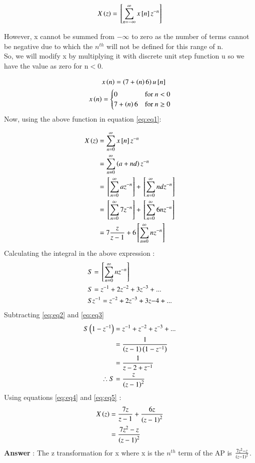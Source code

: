 \documentclass[journal,12pt,twocolumn]{IEEEtran}
\theoremstyle{remark}
\begin{document}
\begin{equation}\label{eq:eq1}
    X\left(z\right) ={}\left[\sum_{n=-\infty}^{\infty}x{}\left[n\right]z^{-n}\right] 
\end{equation}

However, x cannot be summed from $-\infty$ to zero as the number of terms cannot be negative due to which the $n^{th}$ will not be defined for this range of n.\\
So, we will modify x by multiplying it with discrete unit step function u so we have the value as zero for n$<$0.

\begin{align}
&x\left(n\right) = \left(7 + \left(n\right)6\right)u{}\left[n\right] \\
     x\left(n\right) & = \begin{cases} 
        0 & \text{for } n < 0 \\
        7 + \left(n\right)6 & \text{for } n \geq 0
    \end{cases}
\end{align}
Now, using the above function in equation \eqref{eq:eq1}: 

\begin{align}
X\left(z\right) &= \sum_{n=0}^{\infty}x{}\left[n\right]z^{-n}\\
 &= \sum_{n=0}^{\infty}\left(a+nd\right)z^{-n} \\
 &=  {}\left[\sum_{n=0}^{\infty}az^{-n}\right] + {}\left[\sum_{n=0}^{\infty}ndz^{-n}\right]\\
 &=  {}\left[\sum_{n=0}^{\infty}7z^{-n}\right] + {}\left[\sum_{n=0}^{\infty}6nz^{-n}\right]\\
 &= 7\frac{z}{z-1} + 6{}\left[\sum_{n=0}^{\infty}nz^{-n}\right] \label{eq:eq4}
\end{align}
Calculating the integral in the above expression :\\
\begin{align}
&S =  {}\left[\sum_{n=0}^{\infty}nz^{-n}\right]\\ 
&S = z^{-1} + 2z^{-2} + 3z^{-3} + ... \label{eq:eq2}\\
&Sz^{-1} = z^{-2} + 2z^{-3} + 3z{-4} + \label{eq:eq3} ... 
\end{align}
Subtracting \eqref{eq:eq2} and \eqref{eq:eq3} \\
\begin{align}
S\left(1-z^{-1}\right) &= z^{-1} + z^{-2} + z^{-3} + ... \\
 &= \frac{1}{\left(z-1\right)\left(1-z^{-1}\right)}\\
 &= \frac{1}{z-2+z^{-1}}\\
\therefore S &= \frac{z}{\left(z-1\right)^2} \label{eq:eq5}
\end{align}
Using equations \eqref{eq:eq4} and \eqref{eq:eq5} :\\
\begin{align}
X\left(z\right) &= \frac{7z}{z-1} + \frac{6z}{\left(z-1\right)^2}\\
 &= \frac{7z^{2}-z}{\left(z-1\right)^2}
\end{align}
\large\textbf{Answer} : \normalsize The z transformation for x where x is the $n^{th}$ term of the AP is $\frac{7z^{2} - z}{\left(z-1\right)^2}$.
\end{document}
